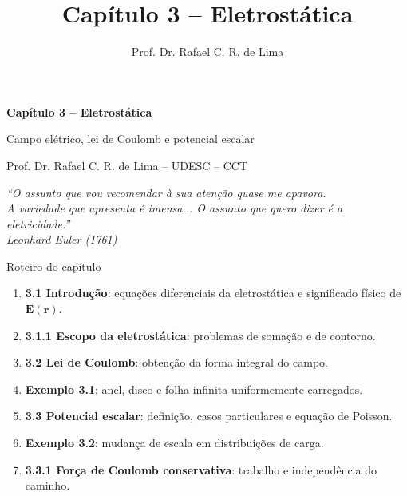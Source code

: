 \documentclass[aspectratio=169,11pt]{beamer}
\title{Capítulo 3 -- Eletrostática}
\author{Prof. Dr. Rafael C. R. de Lima}
\institute{UDESC -- CCT}
\date{}
\newcommand{\E}{\mathbf{E}}
\newcommand{\rr}{\mathbf{r}}
\begin{document}
\begin{frame}[plain]
    \vspace{1.0cm}
    {
    \centering
    {
      \fontsize{24}{28}\selectfont\bfseries\color{white}
      Capítulo 3 -- Eletrostática\par}
    \vspace{0.45cm}
    {
      \Large\color{white!92}Campo elétrico, lei de Coulomb e potencial escalar\par}
    \vspace{0.8cm}
    {
      \large\color{white!85}Prof. Dr. Rafael C. R. de Lima \;--\; UDESC -- CCT\par}
    \vspace{0.6cm}
    {
      \normalsize\itshape\color{white!80}
      ``O assunto que vou recomendar à sua atenção quase me apavora.\\
      A variedade que apresenta é imensa... O assunto que quero dizer é a eletricidade.''\\
      \vspace{1mm}
      Leonhard Euler (1761)\par}
    }
\end{frame}

\begin{frame}{Roteiro do capítulo}
\begin{mybox}
\begin{enumerate}
    \item \textbf{3.1 Introdução}: equações diferenciais da eletrostática e significado físico de \(\E(\rr)\).
    \item \textbf{3.1.1 Escopo da eletrostática}: problemas de somação e de contorno.
    \item \textbf{3.2 Lei de Coulomb}: obtenção da forma integral do campo.
    \item \textbf{Exemplo 3.1}: anel, disco e folha infinita uniformemente carregados.
    \item \textbf{3.3 Potencial escalar}: definição, casos particulares e equação de Poisson.
    \item \textbf{Exemplo 3.2}: mudança de escala em distribuições de carga.
    \item \textbf{3.3.1 Força de Coulomb conservativa}: trabalho e independência do caminho.
\end{enumerate}
\end{mybox}
\end{frame}
\end{document}
